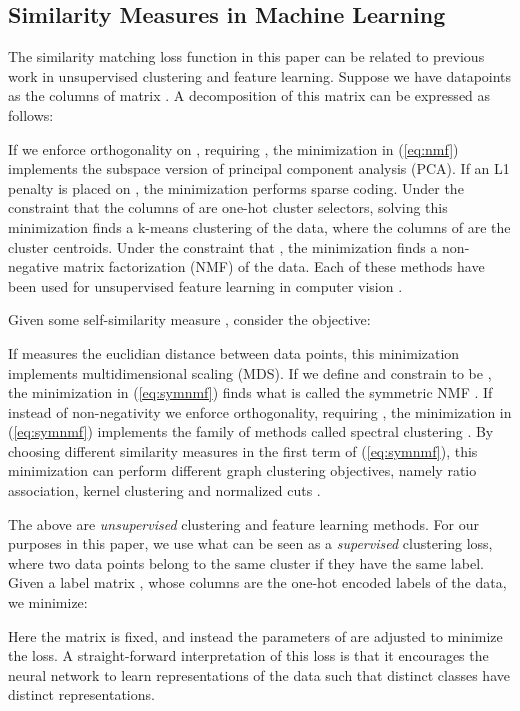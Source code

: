 \documentclass{article}
\begin{document}
\subsection{Similarity Measures in Machine Learning}

The similarity matching loss function in this paper can be related to previous work in unsupervised clustering and feature learning. Suppose we have  datapoints as the columns of matrix . A decomposition of this matrix can be expressed as follows:

If we enforce orthogonality on , requiring , the minimization in (\ref{eq:nmf}) implements the subspace version of principal component analysis (PCA). If an L1 penalty is placed on , the minimization performs sparse coding. Under the constraint that the  columns of  are one-hot cluster selectors, solving this minimization finds a k-means clustering of the data, where the  columns of  are the cluster centroids. Under the constraint that , the minimization finds a non-negative matrix factorization (NMF) of the data. Each of these methods have been used for unsupervised feature learning in computer vision \cite{CoatesN11,Raina2007,lee1999learning}.

Given some self-similarity measure , consider the objective:

If  measures the euclidian distance between data points, this minimization implements multidimensional scaling (MDS). If we define  and constrain  to be , the minimization in (\ref{eq:symnmf}) finds what is called the symmetric NMF \cite{Kuang2012}. If instead of non-negativity we enforce orthogonality, requiring , the minimization in (\ref{eq:symnmf}) implements \cite{Ding2005,Kuang2012} the family of methods called spectral clustering \cite{Ng2002spectral}. By choosing different similarity measures  in the first term of (\ref{eq:symnmf}), this minimization can perform different graph clustering objectives, namely ratio association, kernel clustering and normalized cuts \cite{Kuang2012}.

The above are \textit{unsupervised} clustering and feature learning methods. For our purposes in this paper, we use what can be seen as a \textit{supervised} clustering loss, where two data points belong to the same cluster if they have the same label. Given a label matrix , whose columns are the one-hot encoded labels of the data, we minimize:

Here the matrix  is fixed, and instead the parameters  of  are adjusted to minimize the loss. A straight-forward interpretation of this loss is that it encourages the neural network to learn representations of the data such that distinct classes have distinct representations.
\end{document}
